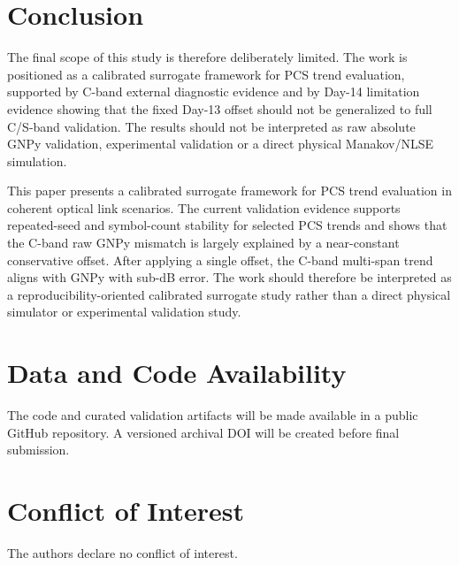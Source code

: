 ﻿\documentclass[pdflatex,sn-mathphys-num]{sn-jnl}
\begin{document}
\section{Conclusion}

The final scope of this study is therefore deliberately limited. The work is positioned as a calibrated surrogate framework for PCS trend evaluation, supported by C-band external diagnostic evidence and by Day-14 limitation evidence showing that the fixed Day-13 offset should not be generalized to full C/S-band validation. The results should not be interpreted as raw absolute GNPy validation, experimental validation or a direct physical Manakov/NLSE simulation.


This paper presents a calibrated surrogate framework for PCS trend evaluation in coherent optical link scenarios. The current validation evidence supports repeated-seed and symbol-count stability for selected PCS trends and shows that the C-band raw GNPy mismatch is largely explained by a near-constant conservative offset. After applying a single offset, the C-band multi-span trend aligns with GNPy with sub-dB error. The work should therefore be interpreted as a reproducibility-oriented calibrated surrogate study rather than a direct physical simulator or experimental validation study.

\section*{Data and Code Availability}

The code and curated validation artifacts will be made available in a public GitHub repository. A versioned archival DOI will be created before final submission.

\section*{Conflict of Interest}

The authors declare no conflict of interest.


\end{document}

